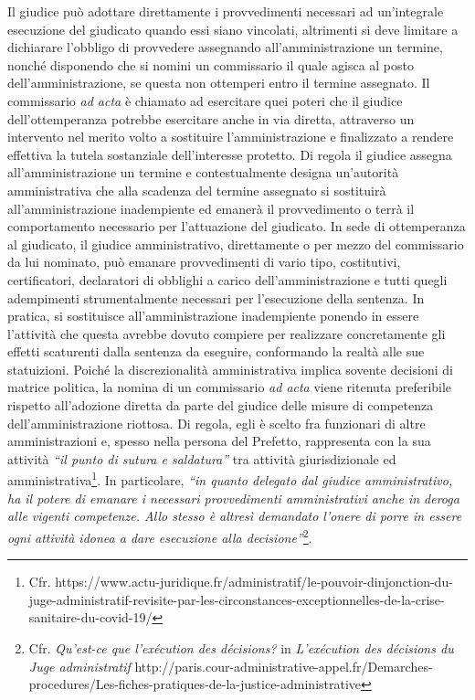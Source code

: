 \documentclass[12pt,it,a4paper,]{report}
\begin{document}
Il giudice può adottare direttamente i provvedimenti necessari ad
un'integrale esecuzione del giudicato quando essi siano vincolati,
altrimenti si deve limitare a dichiarare l'obbligo di provvedere
assegnando all'amministrazione un termine, nonché disponendo che si
nomini un commissario il quale agisca al posto dell'amministrazione, se
questa non ottemperi entro il termine assegnato. Il commissario \emph{ad
acta} è chiamato ad esercitare quei poteri che il giudice
dell'ottemperanza potrebbe esercitare anche in via diretta, attraverso
un intervento nel merito volto a sostituire l'amministrazione e
finalizzato a rendere effettiva la tutela sostanziale dell'interesse
protetto. Di regola il giudice assegna all'amministrazione un termine e
contestualmente designa un'autorità amministrativa che alla scadenza del
termine assegnato si sostituirà all'amministrazione inadempiente ed
emanerà il provvedimento o terrà il comportamento necessario per
l'attuazione del giudicato. In sede di ottemperanza al giudicato, il
giudice amministrativo, direttamente o per mezzo del commissario da lui
nominato, può emanare provvedimenti di vario tipo, costitutivi,
certificatori, declaratori di obblighi a carico dell'amministrazione e
tutti quegli adempimenti strumentalmente necessari per l'esecuzione
della sentenza. In pratica, si sostituisce all'amministrazione
inadempiente ponendo in essere l'attività che questa avrebbe dovuto
compiere per realizzare concretamente gli effetti scaturenti dalla
sentenza da eseguire, conformando la realtà alle sue statuizioni. Poiché
la discrezionalità amministrativa implica sovente decisioni di matrice
politica, la nomina di un commissario \emph{ad acta} viene ritenuta
preferibile rispetto all'adozione diretta da parte del giudice delle
misure di competenza dell'amministrazione riottosa. Di regola, egli è
scelto fra funzionari di altre amministrazioni e, spesso nella persona
del Prefetto, rappresenta con la sua attività \emph{``il punto di sutura
e saldatura''} tra attività giurisdizionale ed
amministrativa\footnote{Cfr.
  https://www.actu-juridique.fr/administratif/le-pouvoir-dinjonction-du-juge-administratif-revisite-par-les-circonstances-exceptionnelles-de-la-crise-sanitaire-du-covid-19/}.
In particolare, \emph{``in quanto delegato dal giudice amministrativo,
ha il potere di emanare i necessari provvedimenti amministrativi anche
in deroga alle vigenti competenze. Allo stesso è altresì demandato
l'onere di porre in essere ogni attività idonea a dare esecuzione alla
decisione''}\footnote{Cfr. \emph{Qu'est-ce que l'exécution des
  décisions?} in \emph{L'exécution des décisions du Juge administratif}
  http://paris.cour-administrative-appel.fr/Demarches-procedures/Les-fiches-pratiques-de-la-justice-administrative}.
\end{document}
